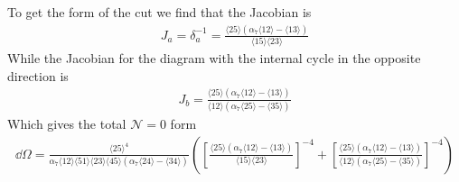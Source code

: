 \documentclass[letter,11pt]{article}
\newcommand{\ab}[1]{\langle #1 \rangle}
\begin{document}
To get the form of the cut we find that the Jacobian is
\begin{equation}
	\begin{aligned}
		J_a=\delta_a^{-1}=
		\frac{\ab{25}\left(\alpha_7\ab{12}-\ab{13}\right)}{\ab{15}\ab{23}}
	\end{aligned}
\end{equation}
While the Jacobian for the diagram with the internal cycle in the opposite direction is
\begin{equation}
	\begin{aligned}
		J_b=
		\frac{\ab{25}\left(\alpha_7\ab{12}-\ab{13}\right)}{\ab{12}\left(\alpha_7\ab{25}-\ab{35}\right)}
	\end{aligned}
\end{equation}
Which gives the total $\mathcal{N}=0$ form
\begin{equation}
	\begin{aligned}
		 \dd\Omega =\frac{\ab{25}^4}{\alpha_7 \ab{12}\ab{51}\ab{23}\ab{45}\left(\alpha_7\ab{24}-\ab{34}\right)}\left(	\left[\frac{\ab{25}\left(\alpha_7\ab{12}-\ab{13}\right)}{\ab{15}\ab{23}}\right]^{-4}+
		\left[\frac{\ab{25}\left(\alpha_7\ab{12}-\ab{13}\right)}{\ab{12}\left(\alpha_7\ab{25}-\ab{35}\right)}\right]^{-4}\right)
	\end{aligned}
\end{equation}
\end{document}

